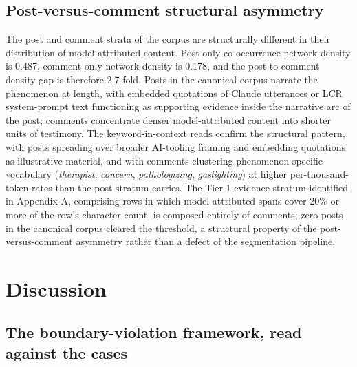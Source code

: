 \documentclass[11pt]{article}
\begin{document}
\subsection{Post-versus-comment structural asymmetry}

The post and comment strata of the corpus are structurally different in their distribution of model-attributed content. Post-only co-occurrence network density is 0.487, comment-only network density is 0.178, and the post-to-comment density gap is therefore 2.7-fold. Posts in the canonical corpus narrate the phenomenon at length, with embedded quotations of Claude utterances or LCR system-prompt text functioning as supporting evidence inside the narrative arc of the post; comments concentrate denser model-attributed content into shorter units of testimony. The keyword-in-context reads confirm the structural pattern, with posts spreading over broader AI-tooling framing and embedding quotations as illustrative material, and with comments clustering phenomenon-specific vocabulary (\emph{therapist}, \emph{concern}, \emph{pathologizing}, \emph{gaslighting}) at higher per-thousand-token rates than the post stratum carries. The Tier 1 evidence stratum identified in Appendix A, comprising rows in which model-attributed spans cover 20\% or more of the row's character count, is composed entirely of comments; zero posts in the canonical corpus cleared the threshold, a structural property of the post-versus-comment asymmetry rather than a defect of the segmentation pipeline.

\FloatBarrier

\section{Discussion}

\subsection{The boundary-violation framework, read against the cases}
\end{document}
